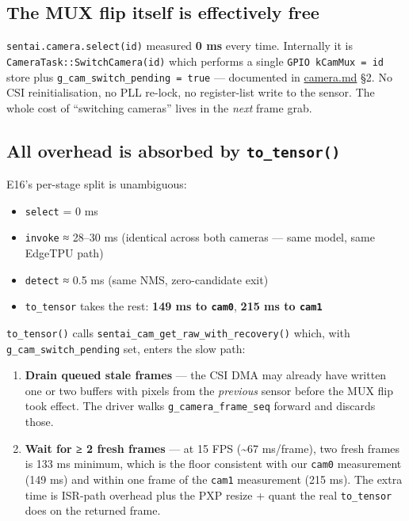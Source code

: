 \subsection{The MUX flip itself is effectively
free}\label{the-mux-flip-itself-is-effectively-free}

\texttt{sentai.camera.select(id)} measured \textbf{0 ms} every time.
Internally it is \texttt{CameraTask::SwitchCamera(id)} which performs a
single \texttt{GPIO\ kCamMux\ =\ id} store plus
\texttt{g\_cam\_switch\_pending\ =\ true} --- documented in
\url{camera.md} §2. No CSI reinitialisation, no PLL re-lock, no
register-list write to the sensor. The whole cost of ``switching
cameras'' lives in the \emph{next} frame grab.

\subsection{\texorpdfstring{All overhead is absorbed by
\texttt{to\_tensor()}}{All overhead is absorbed by to\_tensor()}}\label{all-overhead-is-absorbed-by-to_tensor}

E16's per-stage split is unambiguous:

\begin{itemize}
\tightlist
\item
  \texttt{select} = 0 ms
\item
  \texttt{invoke} ≈ 28--30 ms (identical across both cameras --- same
  model, same EdgeTPU path)
\item
  \texttt{detect} ≈ 0.5 ms (same NMS, zero-candidate exit)
\item
  \texttt{to\_tensor} takes the rest: \textbf{149 ms to \texttt{cam0}},
  \textbf{215 ms to \texttt{cam1}}
\end{itemize}

\texttt{to\_tensor()} calls
\texttt{sentai\_cam\_get\_raw\_with\_recovery()} which, with
\texttt{g\_cam\_switch\_pending} set, enters the slow path:

\begin{enumerate}
\def\labelenumi{\arabic{enumi}.}
\tightlist
\item
  \textbf{Drain queued stale frames} --- the CSI DMA may already have
  written one or two buffers with pixels from the \emph{previous} sensor
  before the MUX flip took effect. The driver walks
  \texttt{g\_camera\_frame\_seq} forward and discards those.
\item
  \textbf{Wait for ≥ 2 fresh frames} --- at 15 FPS (\textasciitilde67
  ms/frame), two fresh frames is 133 ms minimum, which is the floor
  consistent with our \texttt{cam0} measurement (149 ms) and within one
  frame of the \texttt{cam1} measurement (215 ms). The extra time is
  ISR-path overhead plus the PXP resize + quant the real
  \texttt{to\_tensor} does on the returned frame.
\end{enumerate}

